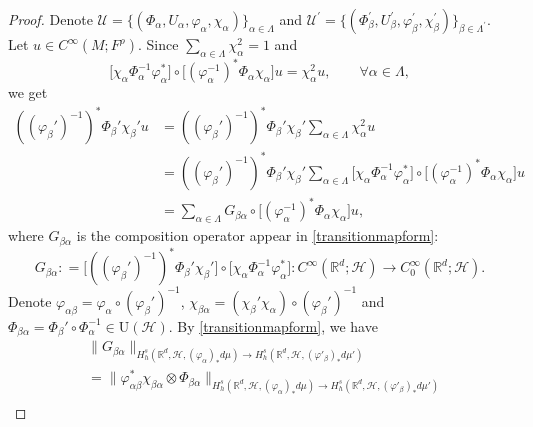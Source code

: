 \documentclass[11pt,oneside,reqno]{amsart}
\newcommand\R{\ensuremath{\mathbb{R}}}
\theoremstyle{definition}
\numberwithin{equation}{section}
\theoremstyle{plain}
\begin{document}
\begin{proof}
Denote $\mathcal{U}=\{(\Phi_{\alpha},U_{\alpha},\varphi_{\alpha},\chi_{\alpha})\}_{\alpha \in \Lambda}$ and $\mathcal{U}^{\prime}=\{(\Phi_{\beta}^{\prime},U_{\beta}^{\prime},\varphi_{\beta}^{\prime},\chi_{\beta}^{\prime})\}_{\beta \in \Lambda^{\prime}}$. Let $u \in C^{\infty}(M;F^{\rho})$. Since $\sum_{\alpha \in \Lambda} \chi_\alpha^2 =1$ and 
\begin{equation*}
    \big[\chi_\alpha\Phi_\alpha^{-1}\varphi_\alpha^* \big] \circ \big[ (\varphi_\alpha^{-1})^*\Phi_\alpha\chi_\alpha  \big] u = \chi_\alpha^2 u, \qquad \forall \alpha \in \Lambda,
\end{equation*}
we get
\begin{equation}\label{for49}
\begin{aligned}
    ((\varphi_{\beta}')^{-1})^*\Phi_{\beta}'\chi_{\beta}'u
    &=((\varphi_{\beta}')^{-1})^*\Phi_{\beta}'\chi_{\beta}' \sum_{\alpha \in \Lambda} \chi_\alpha^2u \\
    &=((\varphi_{\beta}')^{-1})^*\Phi_{\beta}'\chi_{\beta}' \sum_{\alpha \in \Lambda}\big[\chi_\alpha\Phi_\alpha^{-1}\varphi_\alpha^* \big] \circ \big[ (\varphi_\alpha^{-1})^*\Phi_\alpha\chi_\alpha  \big] u \\
    & = \sum_{\alpha \in \Lambda} G_{\beta \alpha} \circ \big[ (\varphi_\alpha^{-1})^*\Phi_\alpha\chi_\alpha  \big] u ,
\end{aligned}
\end{equation}
where $G_{\beta \alpha}$ is the composition operator appear in \eqref{transitionmapform}:
\begin{equation*}
    G_{\beta \alpha} : = \big[((\varphi_{\beta}')^{-1})^*\Phi_{\beta}'\chi_{\beta}'  \big]\circ \big[\chi_\alpha\Phi_\alpha^{-1}\varphi_\alpha^* \big] :C^{\infty}(\R^d;\mathcal{H})\rightarrow C^{\infty}_{0}(\R^d;\mathcal{H}).
\end{equation*}
Denote $\varphi_{\alpha \beta } = \varphi_\alpha \circ (\varphi_\beta')^{-1}$, $\chi_{\beta \alpha} = (\chi_\beta' \chi_\alpha) \circ (\varphi_\beta')^{-1}$ and $\Phi_{\beta \alpha} = \Phi_\beta' \circ \Phi^{-1}_\alpha \in \mathrm{U}(\mathcal{H})$. By \eqref{transitionmapform}, we have
\begin{equation}\label{normdependence}
\begin{aligned}
    &\| G_{\beta \alpha} \|_{H^{s}_{h}(\R^d,\mathcal{H},(\varphi_{\alpha})_{*}d\mu)\to H^{s}_{h}(\R^d,\mathcal{H},(\varphi'_{\beta})_{*}d\mu')} \\
    &= \| \varphi_{\alpha \beta }^* \chi_{\beta \alpha } \otimes \Phi_{\beta \alpha } \|_{H^{s}_{h}(\R^d,\mathcal{H},(\varphi_{\alpha})_{*}d\mu)\to H^{s}_{h}(\R^d,\mathcal{H},(\varphi'_{\beta})_{*}d\mu')} \\

\end{aligned}
\end{equation}
\end{proof}
\end{document}
